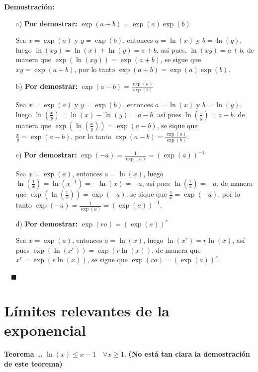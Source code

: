 \documentclass{article}
\numberwithin{equation}{section}
\newcommand{\Col}{\color{ProcessBlue}}
\newcommand{\col}[1]{\textcolor{ProcessBlue}{#1}}
\newcounter{theorem}[section]
\newenvironment
{theorem}[1][]
{\vspace{0.5cm}\refstepcounter{theorem}\par\medskip\noindent\textbf{\Col Teorema~\thesection.\thetheorem. #1}\rmfamily}
{}
\newenvironment
{proof}
{\par\medskip\noindent\textbf{Demostración:}\rmfamily}
{\Col\hfill$\quad \blacksquare$\vspace{0.5cm}}
\begin{document}
\begin{proof}
    \begin{enumerate}
        \item[a)] \textbf{Por demostrar:} $\exp(a+b)=\exp(a)\exp(b)$
        
        Sea $x=\exp(a)$ y $y=\exp(b)$, entonces $a=\ln(x)$ y $b=\ln(y)$, luego $\ln(xy)=\ln(x)+\ln(y)=a+b$, 
        así pues, $\ln(xy)=a+b$, de manera que $\exp(\ln(xy))=\exp(a+b)$, se sigue que $xy=\exp(a+b)$, por lo tanto $\exp(a+b)=\exp(a)\exp(b)$.
        
        \item[b)] \textbf{Por demostrar:} $\exp(a-b)=\frac{\exp(a)}{\exp(b)}$
        
        Sea $x=\exp(a)$ y $y=\exp(b)$, entonces $a=\ln(x)$ y $b=\ln(y)$, luego $\ln\left(\frac{x}{y}\right)=\ln(x)-\ln(y)=a-b$, así pues $\ln\left(\frac{x}{y}\right)=a-b$, de manera que $\exp\left(\ln\left(\frac{x}{y}\right)\right)=\exp(a-b)$, se sique que $\frac{x}{y}=\exp(a-b)$, por lo tanto $\exp(a-b)=\frac{\exp(a)}{\exp(b)}$.
        
        \item[c)] \textbf{Por demostrar:} $\exp(-a)=\frac{1}{\exp(a)}=(\exp(a))^{-1}$
        
        Sea $x=\exp(a)$, entonces $a=\ln(x)$, luego $\ln\left(\frac{1}{x}\right)=\ln(x^{-1})=-\ln(x)=-a$, así pues $\ln\left(\frac{1}{x}\right)=-a$, de manera que $\exp\left(\ln\left(\frac{1}{x}\right)\right)=\exp(-a)$, se sique que $\frac{1}{x}=\exp(-a)$, por lo tanto $\exp(-a)=\frac{1}{\exp(a)}=(\exp(a))^{-1}$.
        
        \item[d)] \textbf{Por demostrar:} $\exp(ra)=(\exp(a))^r$
        
        Sea $x=\exp(a)$, entonces $a=\ln(x)$, luego $\ln(x^r)=r\ln(x)$, así pues $\exp(\ln(x^r))=\exp(r\ln(x))$, de manera que $x^r=\exp(r\ln(x))$, se sigue que $\exp(ra)=(\exp(a))^{r}$.
        
    \end{enumerate}
\end{proof}

\section{\col{Límites relevantes de la exponencial}}

\begin{theorem}
    $\ln(x)\leq x-1 \quad \forall x\geq 1$. \textbf{(No está tan clara la demostración de este teorema)}
\end{theorem}
\end{document}
